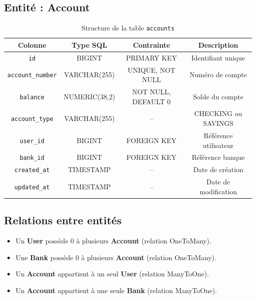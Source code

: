 \documentclass[12pt,a4paper]{article}
\newcommand{\tableheader}[1]{\textbf{#1}}
\begin{document}
\subsection{Entité : Account}

\begin{table}[H]
    \centering
    \renewcommand{\arraystretch}{1.3}
    \begin{tabular}{|c|c|c|c|}
        \hline
        \tableheader{Colonne} & \tableheader{Type SQL} & \tableheader{Contrainte} & \tableheader{Description} \\
        \hline
        \texttt{id} & BIGINT & PRIMARY KEY & Identifiant unique \\
        \hline
        \texttt{account\_number} & VARCHAR(255) & UNIQUE, NOT NULL & Numéro de compte \\
        \hline
        \texttt{balance} & NUMERIC(38,2) & NOT NULL, DEFAULT 0 & Solde du compte \\
        \hline
        \texttt{account\_type} & VARCHAR(255) & -- & CHECKING ou SAVINGS \\
        \hline
        \texttt{user\_id} & BIGINT & FOREIGN KEY & Référence utilisateur \\
        \hline
        \texttt{bank\_id} & BIGINT & FOREIGN KEY & Référence banque \\
        \hline
        \texttt{created\_at} & TIMESTAMP & -- & Date de création \\
        \hline
        \texttt{updated\_at} & TIMESTAMP & -- & Date de modification \\
        \hline
    \end{tabular}
    \caption{Structure de la table \texttt{accounts}}
\end{table}

\subsection{Relations entre entités}

\begin{itemize}
    \item Un \textbf{User} possède 0 à plusieurs \textbf{Account} (relation OneToMany).
    \item Une \textbf{Bank} possède 0 à plusieurs \textbf{Account} (relation OneToMany).
    \item Un \textbf{Account} appartient à un seul \textbf{User} (relation ManyToOne).
    \item Un \textbf{Account} appartient à une seule \textbf{Bank} (relation ManyToOne).
\end{itemize}
\end{document}
